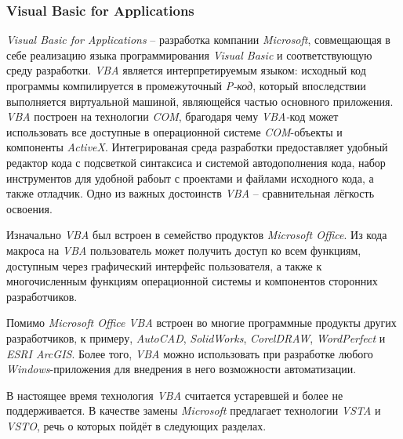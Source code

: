 \subsubsection{Visual Basic for Applications}

{\it Visual Basic for Applications} -- разработка компании {\it Microsoft}, совмещающая в себе реализацию языка программирования {\it Visual Basic} и соответствующую среду разработки. {\it VBA} является интерпретируемым языком: исходный код программы компилируется в промежуточный {\it P-код}, который впоследствии выполняется виртуальной машиной, являющейся частью основного приложения. {\it VBA} построен на технологии {\it COM}, брагодаря чему {\it VBA-}код может использовать все доступные в операционной системе {\it COM}-объекты и компоненты {\it ActiveX}. Интегрированая среда разработки предоставляет удобный редактор кода с подсветкой синтаксиса и системой автодополнения кода, набор инструментов для удобной рабоыт с проектами и файлами исходного кода, а также отладчик. Одно из важных достоинств {\it VBA} -- сравнительная лёгкость освоения.

Изначально {\it VBA} был встроен в семейство продуктов {\it Microsoft Office}. Из кода макроса на {\it VBA} пользователь может получить доступ ко всем функциям, доступным через графический интерфейс пользователя, а также к многочисленным функциям операционной системы и компонентов сторонних разработчиков.

Помимо {\it Microsoft Office} {\it VBA} встроен во многие программные продукты других разработчиков, к примеру,  {\it AutoCAD}, {\it SolidWorks}, {\it CorelDRAW}, {\it WordPerfect} и {\it ESRI ArcGIS}. Более того, {\it VBA} можно использовать при разработке любого {\it Windows}-приложения для внедрения в него возможности автоматизации. 

В настоящее время технология {\it VBA} считается устаревшей и более не поддерживается. В качестве замены {\it Microsoft} предлагает технологии {\it VSTA} и {\it VSTO}, речь о которых пойдёт в следующих разделах.